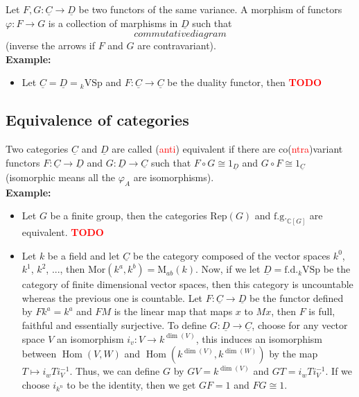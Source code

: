 \documentclass{article}
\theoremstyle{plain}
\theoremstyle{definition}
\newcommand{\C}{\mathbb{C}}
\DeclareMathOperator{\Hom}{Hom}
\newcommand{\td}{\textcolor{red}{\textbf{TODO}}}
\newcommand{\isomorphic}{\cong}
\newenvironment{example}{\noindent\textbf{Example:} \vspace{-0.2cm}\begin{itemize}}{\end{itemize}}
\begin{document}
Let $F,G : \underline{C} \to \underline{D}$ be two functors of the same variance. A morphism of functors $\varphi : F \to G$ is a collection of marphisms in $\underline{D}$ such that 
$$commutative diagram$$
(inverse the arrows if $F$ and $G$ are contravariant). \\

\begin{example}
    \item Let $\underline{C} = \underline{D} = {}_k\text{VSp}$ and $F : \underline{C} \to \underline{C}$ be the duality functor, then \td 
\end{example}

\subsection{Equivalence of categories}

Two categories $\underline{C}$ and $\underline{D}$ are called (\textcolor{red}{anti}) equivalent if there are co(\textcolor{red}{ntra})variant functors $F : \underline{C} \to \underline{D}$ and $G : \underline{D} \to \underline{C}$ such that $F \circ G \isomorphic 1_{\underline{D}}$ and $G \circ F \isomorphic 1_{\underline{C}}$ (isomorphic means all the $\varphi_A$ are isomorphisms).\\

\begin{example}
    \item Let $G$ be a finite group, then the categories $\text{Rep}(G)$ and $\text{f.g.}_{\C[G]}$ are equivalent. \td 
    \item Let $k$ be a field and let $\underline{C}$ be the category composed of the vector spaces $k^0$, $k^1$, $k^2$, ..., then $\text{Mor}(k^a, k^b) = \text{M}_{ab}(k)$. Now, if we let $\underline{D} = \text{f.d.}_k\text{VSp}$ be the category of finite dimensional vector spaces, then this category is uncountable whereas the previous one is countable. Let $F : \underline{C} \to \underline{D}$ be the functor defined by $Fk^a = k^a$ and $FM$ is the linear map that maps $x$ to $Mx$, then $F$ is full, faithful and essentially surjective. To define $G : \underline{D} \to \underline{C}$, choose for any vector space $V$ an isomorphism $i_v : V \to k^{\dim(V)}$, this induces an isomorphism between $\Hom(V,W)$ and $\Hom(k^{\dim(V)}, k^{\dim(W)})$ by the map $T \mapsto i_w T i_V^{-1}$. Thus, we can define $G$ by $GV = k^{\dim(V)}$ and $GT = i_w T i_V^{-1}$. If we choose $i_{k^n}$ to be the identity, then we get $GF = 1$ and $FG \isomorphic 1$.
\end{example}
\end{document}
